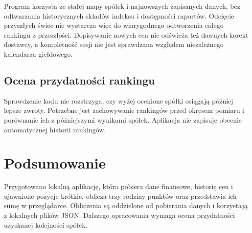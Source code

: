 \documentclass[12pt,a4paper,twoside]{report}
\begin{document}
Program korzysta ze stałej mapy spółek i najnowszych zapisanych danych, bez odtwarzania historycznych składów indeksu i dostępności raportów. Odcięcie przyszłych świec nie wystarcza więc do wiarygodnego odtworzenia całego rankingu z przeszłości. Dopisywanie nowych cen nie odświeża też dawnych korekt dostawcy, a kompletność sesji nie jest sprawdzana względem niezależnego kalendarza giełdowego.

\section{Ocena przydatności rankingu}

Sprawdzenie kodu nie rozstrzyga, czy wyżej ocenione spółki osiągają później lepsze zwroty. Potrzebne jest zachowywanie rankingów przed okresem pomiaru i porównanie ich z późniejszymi wynikami spółek. Aplikacja nie zapisuje obecnie automatycznej historii rankingów.


\cleardoublepage
\chapter{Podsumowanie}

Przygotowano lokalną aplikację, która pobiera dane finansowe, historię cen i ujawnione pozycje krótkie, oblicza trzy rodziny punktów oraz przedstawia ich sumę w przeglądarce. Obliczenia są oddzielone od pobierania danych i korzystają z lokalnych plików JSON. Dalszego opracowania wymaga ocena przydatności uzyskanej kolejności spółek.

\end{document}
